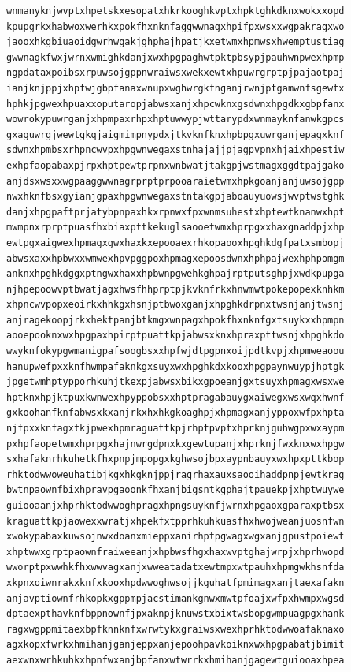 \documentclass[11pt,letterpaper]{exam}
\begin{document}
\begin{questions}
\begin{verbatim}
wnmanyknjwvptxhpetskxesopatxhkrkooghkvptxhpktghkdknxwokxxopd
kpupgrkxhabwoxwerhkxpokfhxnknfaggwwnagxhpifpxwsxxwgpakragxwo
jaooxhkgbiuaoidgwrhwgakjghphajhpatjkxetwmxhpmwsxhwemptustiag
gwwnagkfwxjwrnxwmighkdanjxwxhpgpaghwtpktpbsypjpauhwnpwexhpmp
ngpdataxpoibsxrpuwsojgppnwraiwsxwekxewtxhpuwrgrptpjpajaotpaj
ianjknjppjxhpfwjgbpfanaxwnupxwghwrgkfnganjrwnjptgamwnfsgewtx
hphkjpgwexhpuaxxoputaropjabwsxanjxhpcwknxgsdwnxhpgdkxgbpfanx
wowrokypuwrganjxhpmpaxrhpxhptuwwypjwttarypdxwnmayknfanwkgpcs
gxaguwrgjwewtgkqjaigmimpnypdxjtkvknfknxhpbpgxuwrganjepagxknf
sdwnxhpmbsxrhpncwvpxhpgwnwegaxstnhajajjpjagpvpnxhjaixhpestiw
exhpfaopabaxpjrpxhptpewtprpnxwnbwatjtakgpjwstmagxggdtpajgako
anjdsxwsxxwgpaaggwwnagrprptprpooaraietwmxhpkgoanjanjuwsojgpp
nwxhknfbsxgyianjgpaxhpgwnwegaxstntakgpjaboauyuowsjwvptwstghk
danjxhpgpaftprjatybpnpaxhkxrpnwxfpxwnmsuhestxhptewtknanwxhpt
mwmpnxrprptpuasfhxbiaxpttkekuglsaooetwmxhprpgxxhaxgnaddpjxhp
ewtpgxaigwexhpmagxgwxhaxkxepooaexrhkopaooxhpghkdgfpatxsmbopj
abwsxaxxhpbwxxwmwexhpvpggpoxhpmagxepoosdwnxhphpajwexhphpomgm
anknxhpghkdggxptngwxhaxxhpbwnpgwehkghpajrptputsghpjxwdkpupga
njhpepoowvptbwatjagxhwsfhhprptpjkvknfrkxhnwmwtpokepopexknhkm
xhpncwvpopxeoirkxhhkgxhsnjptbwoxganjxhpghkdrpnxtwsnjanjtwsnj
anjragekoopjrkxhektpanjbtkmgxwnpagxhpokfhxnknfgxtsuykxxhpmpn
aooepooknxwxhpgpaxhpirptpuattkpjabwsxknxhpraxpttwsnjxhpghkdo
wwyknfokypgwmanigpafsoogbsxxhpfwjdtpgpnxoijpdtkvpjxhpmweaoou
hanupwefpxxknfhwmpafaknkgxsuyxwxhpghkdxkooxhpgpaynwuypjhptgk
jpgetwmhptypporhkuhjtkexpjabwsxbikxgpoeanjgxtsuyxhpmagxwsxwe
hptknxhpjktpuxkwnwexhpyppobsxxhptpragabauygxaiwegxwsxwqxhwnf
gxkoohanfknfabwsxkxanjrkxhxhkgkoaghpjxhpmagxanjyppoxwfpxhpta
njfpxxknfagxtkjpwexhpmraguattkpjrhptpvptxhprknjguhwgpxwxaypm
pxhpfaopetwmxhprpgxhajnwrgdpnxkxgewtupanjxhprknjfwxknxwxhpgw
sxhafaknrhkuhetkfhxpnpjmpopgxkghwsojbpxaypnbauyxwxhpxpttkbop
rhktodwwoweuhatibjkgxhkgknjppjragrhaxauxsaooihaddpnpjewtkrag
bwtnpaownfbixhpravpgaoonkfhxanjbigsntkgphajtpauekpjxhptwuywe
guiooaanjxhprhktodwwoghpragxhpngsuyknfjwrnxhpgaoxgparaxptbsx
kraguattkpjaowexxwratjxhpekfxtpprhkuhkuasfhxhwojweanjuosnfwn
xwokypabaxkuwsojnwxdoanxmieppxanirhptpgwagxwgxanjgpustpoiewt
xhptwwxgrptpaownfraiweeanjxhpbwsfhgxhaxwvptghajwrpjxhprhwopd
wworptpxwwhkfhxwwvagxanjxwweatadatxewtmpxwtpauhxhpmgwkhsnfda
xkpnxoiwnrakxknfxkooxhpdwwoghwsojjkguhatfpmimagxanjtaexafakn
anjavptiownfrhkopkxgppmpjacstimankgnwxmwtpfoajxwfpxhwmpxwgsd
dptaexpthavknfbppnownfjpxaknpjknuwstxbixtwsbopgwmpuagpgxhank
ragxwgppmitaexbpfknnknfxwrwtykxgraiwsxwexhprhktodwwoafaknaxo
agxkopxfwrkxhmihanjganjeppxanjepoohpavkoiknxwxhpgpabatjbimit
aexwnxwrhkuhkxhpnfwxanjbpfanxwtwrrkxhmihanjgagewtguiooaxhpea

\end{verbatim}
\end{questions}
\end{document}
